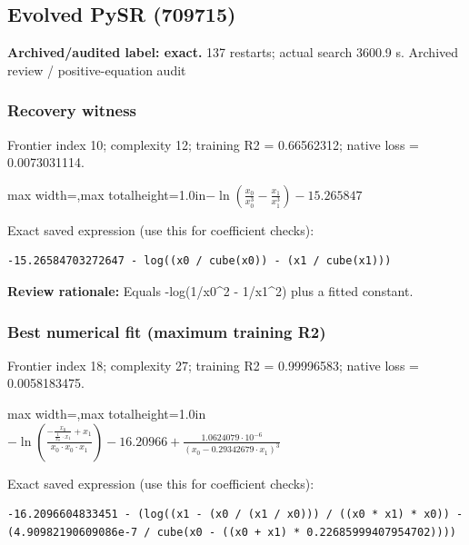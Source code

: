 \documentclass[10pt,letterpaper,landscape]{article}
\begin{document}
\begin{minipage}[t]{0.485\textwidth}
\subsection*{Evolved PySR (709715)}
\textbf{Archived/audited label: exact.} 137 restarts; actual search 3600.9 s.
{\small Archived review / positive-equation audit}
\subsubsection*{Recovery witness}
Frontier index 10; complexity 12; training R2 = 0.66562312; native loss = 0.0073031114.
\begin{center}\begin{adjustbox}{max width=\linewidth,max totalheight=1.0in}$\displaystyle - \ln{\left(\frac{x_{0}}{x_{0}^{3}} - \frac{x_{1}}{x_{1}^{3}} \right)} - 15.265847$\end{adjustbox}\end{center}
{\scriptsize Exact saved expression (use this for coefficient checks):}
\begin{lstlisting}
-15.26584703272647 - log((x0 / cube(x0)) - (x1 / cube(x1)))
\end{lstlisting}
{\small\textbf{Review rationale:} Equals -log(1/x0\textasciicircum{}2 - 1/x1\textasciicircum{}2) plus a fitted constant.}
\subsubsection*{Best numerical fit (maximum training R2)}
Frontier index 18; complexity 27; training R2 = 0.99996583; native loss = 0.0058183475.
\begin{center}\begin{adjustbox}{max width=\linewidth,max totalheight=1.0in}$\displaystyle - \ln{\left(\frac{- \frac{x_{0}}{\frac{1}{x_{0}} \cdot x_{1}} + x_{1}}{x_{0} \cdot x_{0} \cdot x_{1}} \right)} - 16.20966 + \frac{1.0624079 \cdot 10^{-6}}{\left(x_{0} - 0.29342679 \cdot x_{1}\right)^{3}}$\end{adjustbox}\end{center}
{\scriptsize Exact saved expression (use this for coefficient checks):}
\begin{lstlisting}
-16.2096604833451 - (log((x1 - (x0 / (x1 / x0))) / ((x0 * x1) * x0)) - (4.90982190609086e-7 / cube(x0 - ((x0 + x1) * 0.22685999407954702))))
\end{lstlisting}
\end{minipage}
\clearpage{}\label{rydberg-10002}
\end{document}
